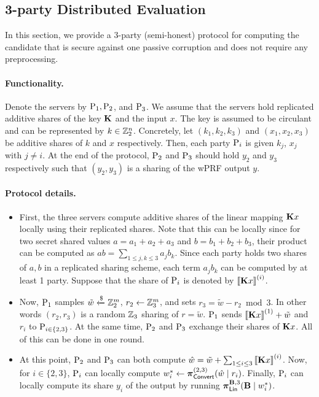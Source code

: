 
\subsection{3-party Distributed Evaluation}
\label{subsec:3party_protocol}

In this section, we provide a 3-party (semi-honest) protocol for computing the \ttwPRF candidate that is secure against one passive corruption and does not require any preprocessing.

\paragraph{Functionality.}
Denote the servers by $\textnormal{P}_1, \textnormal{P}_2$, and $\textnormal{P}_3$. We assume that the servers hold replicated additive shares of the key $\mat{K}$ and the input $x$. The key is assumed to be circulant and can be represented by $k \in \mathbb{Z}_2^n$. Concretely, let $(k_1, k_2, k_3)$ and $(x_1,x_2,x_3)$ be additive shares of $k$ and $x$ respectively. Then, each party $\textnormal{P}_i$ is given $k_j$, $x_j$ with $j \neq i$. At the end of the protocol, $\textnormal{P}_2$ and $\textnormal{P}_3$ should hold $y_2$ and $y_3$ respectively such that $(y_2, y_3)$ is a sharing of the wPRF output $y$.

\paragraph{Protocol details.}
\begin{itemize}
  \item First, the three servers compute additive shares of the linear mapping $\mat{K}{x}$ locally using their replicated shares. Note that this can be locally since for two secret shared values $a = a_1 + a_2 + a_3$ and $b = b_1 + b_2 + b_3$, their product can be computed as $ab = \sum_{1 \leq j,k \leq 3} a_jb_k$. Since each party holds two shares of $a,b$ in a replicated sharing scheme, each term $a_jb_k$ can be computed by at least 1 party. Suppose that the share of $\textnormal{P}_i$ is denoted by $\sharei{\mat{K}x}$.

  \item Now, $\textnormal{P}_1$ samples $\tilde{w} \xleftarrow{\$} \mathbb{Z}_2^m$, $r_2 \gets \mathbb{Z}_3^m$, and sets $r_3 = \tilde{w} - r_2 \bmod 3$. In other words $(r_2, r_3)$ is a random $\mathbb{Z}_3$ sharing of $r = \tilde{w}$. $\textnormal{P}_1$ sends $\share{\mat{K}x}^{(1)} + \tilde{w}$ and $r_i$ to $\textnormal{P}_{i \in \{2,3\}}$. At the same time, $\textnormal{P}_2$ and $\textnormal{P}_3$ exchange their shares of $\mat{K}x$. All of this can be done in one round.

  \item At this point, $\textnormal{P}_2$ and $\textnormal{P}_3$ can both compute $\hat{w} = \tilde{w} + \sum_{1\leq i \leq 3} \sharei{\mat{K}x}$. Now, for $i \in \{2,3\}$, $\textnormal{P}_i$ can locally compute $w^*_i \gets \boldsymbol{\pi}_{\textnormal{\textsf{Convert}}}^{(2,3)}(\hat{w} \mid r_i)$. Finally, $\textnormal{P}_i$ can locally compute its share $y_i$ of the output by running $\prot_\LMap^{\mat{B},3}(\mat{B} \mid w^*_i)$.
\end{itemize}


